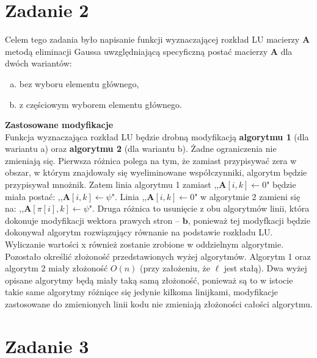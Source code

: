 \documentclass[]{article}
\newcommand{\mA}{\bm{A}}
\newcommand{\vb}{\bm{b}}
\begin{document}
	\section*{Zadanie 2} 
	
	Celem tego zadania było napisanie funkcji wyznaczającej rozkład LU macierzy $\mA$ metodą eliminacji Gaussa uwzględniającą
	specyficzną postać macierzy $\mA$ dla dwóch wariantów:
	\begin{enumerate}[a)]
		\item bez wyboru elementu głównego,
		\item z częściowym wyborem elementu głównego.
	\end{enumerate}
	\textbf{Zastosowane modyfikacje}\\
	Funkcja wyznaczająca rozkład LU będzie drobną modyfikacją \textbf{algorytmu 1} (dla wariantu a) oraz \textbf{algorytmu 2} (dla wariantu b). Żadne ograniczenia nie zmieniają się. Pierwsza różnica polega na tym, że zamiast przypisywać zera w obszar, w którym znajdowały się wyeliminowane współczynniki, algorytm będzie przypisywał mnożnik. 
	Zatem linia algorytmu 1 zamiast ,,$\mA[i,k] \gets 0 $" będzie miała postać: ,,$\mA[i,k] \gets \psi $". Linia ,,$\mA[i,k] \gets 0 $" w algorytmie 2 zamieni się na: ,,$\mA[\pi[i],k] \gets \psi $".
	Druga różnica to usunięcie z obu algorytmów linii, która dokonuje modyfikacji wektora prawych stron -- $\vb$, ponieważ tej modyfkacji będzie dokonywał algorytm rozwiązujący równanie na podstawie rozkładu LU. Wyliczanie wartości x również zostanie zrobione w oddzielnym algorytmie.\\
	Pozostało określić złożoność przedstawionych wyżej algorytmów. Algorytm 1 oraz algorytm 2 miały złożoność $O(n)$ (przy założeniu, że $\ell$ jest stałą). Dwa wyżej opisane algorytmy będą miały taką samą złożoność, ponieważ są to w istocie takie same algorytmy różniące się jedynie kilkoma linijkami, modyfikacje zastosowane do zmienionych linii kodu nie zmieniają złożoności całości algorytmu.
	
	\clearpage
	
	\section*{Zadanie 3}
\end{document}
